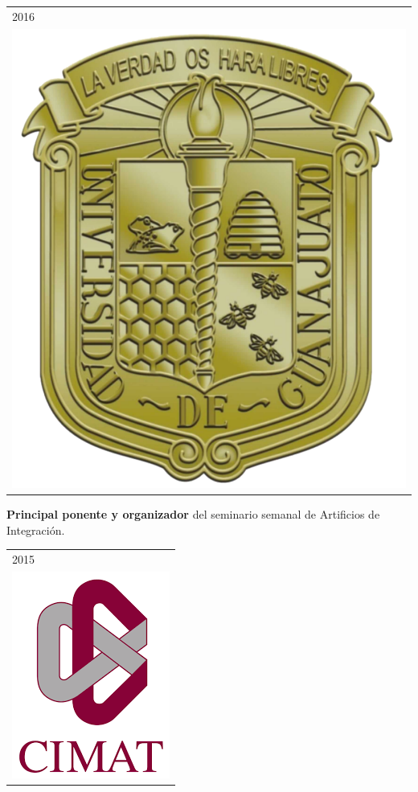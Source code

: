\documentclass[]{friggeri-cv}
\begin{document}
\begin{entrylist}
 \entry
    {   \begin{tabular}{l}
    		\hspace{0.8cm}2016\\
     		\hspace{0.4cm}\includegraphics[scale=0.5]{img/UGTO.png}
	\end{tabular}
    }
    {\vspace{-1.49cm}}
    { }
    {\textbf{Principal ponente y organizador} del seminario semanal de Artificios de Integración.}
\entry
     {   \begin{tabular}{l}
    		\hspace{0.9cm}2015\\
     		\hspace{0.5cm}\includegraphics[scale=0.2]{img/cimat.png}

\end{tabular}}
\end{entrylist}
\end{document}

